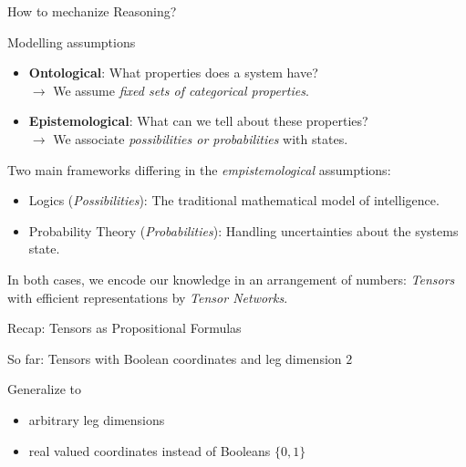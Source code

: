 \documentclass{beamer}
\begin{document}
    \begin{frame}{How to mechanize Reasoning?}

        \begin{block}{Modelling assumptions}
            \begin{itemize}
                \item \textbf{Ontological}: What properties does a system have? \\
                \hspace{0.5cm} $\rightarrow$ We assume \emph{fixed sets of categorical properties}.
                \item \textbf{Epistemological}: What can we tell about these properties? \\
                \hspace{0.5cm} $\rightarrow$ We associate \emph{possibilities or probabilities} with states.
            \end{itemize}
        \end{block}

        Two main frameworks differing in the \emph{empistemological} assumptions:
        \begin{itemize}
            \item Logics (\emph{Possibilities}): The traditional mathematical model of intelligence.
            \item Probability Theory (\emph{Probabilities}): Handling uncertainties about the systems state.
        \end{itemize}
        In both cases, we encode our knowledge in an arrangement of numbers: \emph{Tensors} with efficient representations by \emph{Tensor Networks}.

    \end{frame}



    \begin{frame}{Recap: Tensors as Propositional Formulas}


        So far: Tensors with Boolean coordinates and leg dimension $2$

        Generalize to
        \begin{itemize}
            \item arbitrary leg dimensions
            \item real valued coordinates instead of Booleans $\{0,1\}$
        \end{itemize}
    \end{frame}
\end{document}
